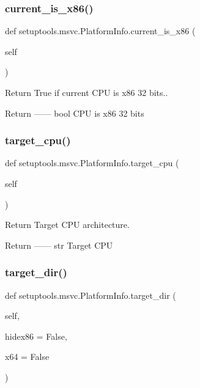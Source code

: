 \subsubsection{\texorpdfstring{current\+\_\+is\+\_\+x86()}{current\_is\_x86()}}
{\footnotesize\ttfamily def setuptools.\+msvc.\+Platform\+Info.\+current\+\_\+is\+\_\+x86 (\begin{DoxyParamCaption}\item[{}]{self }\end{DoxyParamCaption})}

\begin{DoxyVerb}Return True if current CPU is x86 32 bits..

Return
------
bool
    CPU is x86 32 bits
\end{DoxyVerb}
 \mbox{\label{classsetuptools_1_1msvc_1_1PlatformInfo_a2c7d1dc5add6f0b2494e161f364c4644}} 
\subsubsection{\texorpdfstring{target\+\_\+cpu()}{target\_cpu()}}
{\footnotesize\ttfamily def setuptools.\+msvc.\+Platform\+Info.\+target\+\_\+cpu (\begin{DoxyParamCaption}\item[{}]{self }\end{DoxyParamCaption})}

\begin{DoxyVerb}Return Target CPU architecture.

Return
------
str
    Target CPU
\end{DoxyVerb}
 \mbox{\label{classsetuptools_1_1msvc_1_1PlatformInfo_a8ff098933fbab72ab767191b392e486b}} 
\subsubsection{\texorpdfstring{target\+\_\+dir()}{target\_dir()}}
{\footnotesize\ttfamily def setuptools.\+msvc.\+Platform\+Info.\+target\+\_\+dir (\begin{DoxyParamCaption}\item[{}]{self,  }\item[{}]{hidex86 = {\ttfamily False},  }\item[{}]{x64 = {\ttfamily False} }\end{DoxyParamCaption})}

